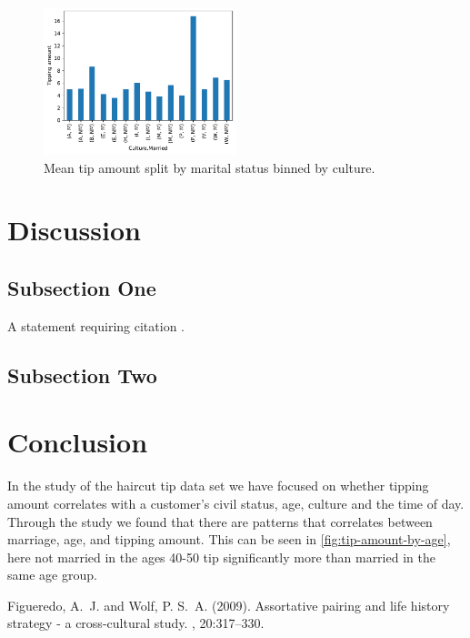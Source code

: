 \documentclass[twoside,twocolumn]{article}
\begin{document}
\begin{figure}[h]
  \centering
  \includegraphics[width=0.5\textwidth]{figures/culture_impact.pdf}
  \caption{Mean tip amount split by marital status binned by culture.}
  \label{fig:culture-impact}
\end{figure}


\section{Discussion}

\subsection{Subsection One}

A statement requiring citation \cite{Figueredo:2009dg}.
\blindtext %

\subsection{Subsection Two}

\blindtext %

\section{Conclusion}
In the study of the haircut tip data set we have focused on whether tipping amount correlates with a customer's civil status, age, culture and the time of day. Through the study we found that there are patterns that correlates between marriage, age, and tipping amount. This can be seen in \figurename{\ref{fig:tip-amount-by-age}}, here not married in the ages 40-50 tip significantly more than married in the same age group.


\begin{thebibliography}{99} %

Figueredo, A.~J. and Wolf, P. S.~A. (2009).
\newblock Assortative pairing and life history strategy - a cross-cultural
  study.
, 20:317--330.

\end{thebibliography}

\end{document}
